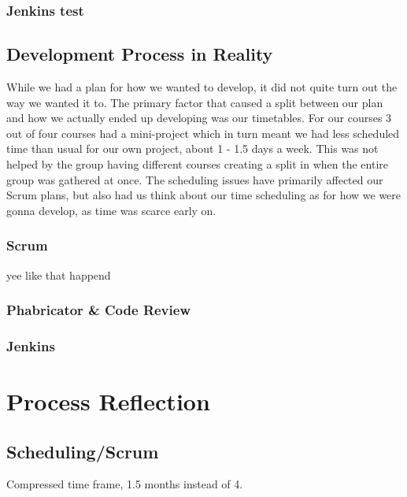 \subsubsection{Jenkins test}
\subsection{Development Process in Reality}
While we had a plan for how we wanted to develop, it did not quite turn out the way we wanted it to.
The primary factor that caused a split between our plan and how we actually ended up developing was our timetables.
For our courses 3 out of four courses had a mini-project which in turn meant we had less scheduled time than usual for our own project, about 1 - 1.5 days a week.
This was not helped by the group having different courses creating a split in when the entire group was gathered at once.
The scheduling issues have primarily affected our Scrum plans, but also had us think about our time scheduling as for how we were gonna develop, as time was scarce early on.
\subsubsection{Scrum}
yee like that happend
\subsubsection{Phabricator \& Code Review}
\subsubsection{Jenkins}
\section{Process Reflection}
\subsection{Scheduling/Scrum}
Compressed time frame, 1.5 months instead of 4.
